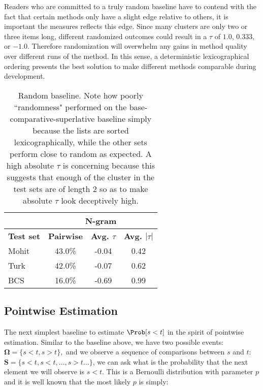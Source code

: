 \begin{remark}
Readers who are committed to a truly random baseline have to contend with the fact that certain methods only have a slight edge relative to others, it is important the measures reflects this edge. Since many clusters are only two or three items long, different randomized outcomes could result in a $\tau$ of $1.0$, $0.333$, or $-1.0$. Therefore randomization will overwhelm any gains in method quality over different runs of the method. In this sense, a deterministic lexicographical ordering presents the best solution to make different methods comparable during development.
\end{remark}

\begin{table}
\small
\centering
\begin{tabular}{|l|ccc|}
	\hline 
	& \multicolumn{3}{c|}{N-gram} \\
	\hline 
	\bf Test set
	& \bf Pairwise & \bf Avg. $\tau$ & \bf Avg. $|\tau|$ \\
	\hline
	Mohit & 43.0\% & -0.04 & 0.42 \\ 
	Turk  & 42.0\% & -0.07 & 0.62 \\
	BCS   & 16.0\% & -0.69 & 0.99 \\
	\hline
\end{tabular}
\caption{\label{font-table} Random baseline. Note how poorly ``randomness" performed on the base-comparative-superlative baseline simply because the lists are sorted lexicographically, while the other sets perform close to random as expected. A high absolute $\tau$ is concerning because this suggests that enough of the cluster in the test sets are of length $2$ so as to make absolute $\tau$ look deceptively high. } 
\end{table}\newpage



\subsection{Pointwise Estimation}

The next simplest baseline to estimate $\Prob[s < t]$ in the spirit of pointwise estimation. Similar to the baseline above, we have two possible events: $\pmb{\Omega} = \{s < t, s > t\},$ and we observe a sequence of comparisons between $s$ and $t$: $\pmb{S} = \{ s < t, s < t, \ldots, s > t \ldots \}$, we can ask what is the probability that the next element we will observe is $s < t$. This is a Bernoulli distribution with parameter $p$ and it is well known that the most likely $p$ is simply:

